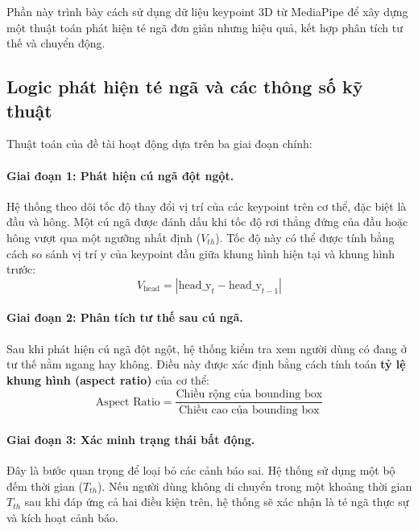 Phần này trình bày cách sử dụng dữ liệu keypoint 3D từ MediaPipe để xây dựng một thuật toán phát hiện té ngã đơn giản nhưng hiệu quả, kết hợp phân tích tư thế và chuyển động. 

\subsection{Logic phát hiện té ngã và các thông số kỹ thuật}

Thuật toán của đề tài hoạt động dựa trên ba giai đoạn chính:

\paragraph{Giai đoạn 1: Phát hiện cú ngã đột ngột.}
Hệ thống theo dõi tốc độ thay đổi vị trí của các keypoint trên cơ thể, đặc biệt là đầu và hông. Một cú ngã được đánh dấu khi tốc độ rơi thẳng đứng của đầu hoặc hông vượt qua một ngưỡng nhất định ($V_{th}$). Tốc độ này có thể được tính bằng cách so sánh vị trí y của keypoint đầu giữa khung hình hiện tại và khung hình trước:
\begin{equation}
V_{\text{head}} = |\text{head\_y}_t - \text{head\_y}_{t-1}|
\end{equation}

\paragraph{Giai đoạn 2: Phân tích tư thế sau cú ngã.}
Sau khi phát hiện cú ngã đột ngột, hệ thống kiểm tra xem người dùng có đang ở tư thế nằm ngang hay không. Điều này được xác định bằng cách tính toán \textbf{tỷ lệ khung hình (aspect ratio)} của cơ thể:
\begin{equation}
\text{Aspect Ratio} = \frac{\text{Chiều rộng của bounding box}}{\text{Chiều cao của bounding box}}
\end{equation}

\paragraph{Giai đoạn 3: Xác minh trạng thái bất động.}
Đây là bước quan trọng để loại bỏ các cảnh báo sai. Hệ thống sử dụng một bộ đếm thời gian ($T_{th}$). Nếu người dùng không di chuyển trong một khoảng thời gian $T_{th}$ sau khi đáp ứng cả hai điều kiện trên, hệ thống sẽ xác nhận là té ngã thực sự và kích hoạt cảnh báo.
